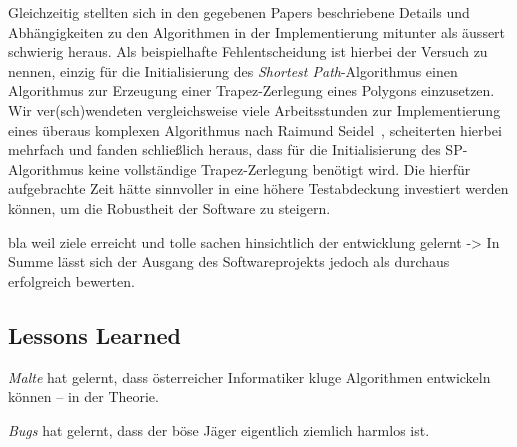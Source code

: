   Gleichzeitig stellten sich in den gegebenen Papers beschriebene Details und
  Abhängigkeiten zu den Algorithmen in der Implementierung mitunter als äussert
  schwierig heraus. Als beispielhafte Fehlentscheidung ist hierbei der Versuch
  zu nennen, einzig für die Initialisierung des \emph{Shortest Path}-Algorithmus
  einen Algorithmus zur Erzeugung einer Trapez-Zerlegung eines Polygons einzusetzen.
  Wir ver(sch)wendeten vergleichsweise viele Arbeitsstunden zur
  Implementierung eines überaus komplexen Algorithmus nach Raimund
  Seidel~\cite{seidel91asimple}, scheiterten hierbei mehrfach und fanden
  schließlich heraus, dass für die Initialisierung des SP-Algorithmus keine
  vollständige Trapez-Zerlegung benötigt wird. Die hierfür aufgebrachte Zeit hätte
  sinnvoller in eine höhere Testabdeckung investiert werden können, um die
  Robustheit der Software zu steigern.

  bla weil ziele erreicht und tolle sachen hinsichtlich der entwicklung gelernt
  -> In Summe lässt sich der Ausgang des Softwareprojekts jedoch als durchaus
  erfolgreich bewerten.

  \subsection{Lessons Learned}

  \begin{lessonlearned}
    \emph{Malte} hat gelernt, dass österreicher Informatiker kluge 
    Algorithmen entwickeln können -- in der Theorie.
  \end{lessonlearned}

  \begin{lessonlearned}
    \emph{Bugs} hat gelernt, dass der böse Jäger eigentlich 
    ziemlich harmlos ist.
  \end{lessonlearned}
